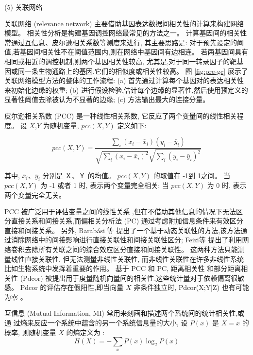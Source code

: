 (5) 关联网络

关联网络 (relevance network) 主要借助基因表达数据间相关性的计算来构建网络模型。
相关性分析是构建基因调控网络最常见的方法之一。
计算基因间的相关性常通过互信息、皮尔逊相关系数等测度来进行, 
其主要思路是: 对于预先设定的阈值,若基因间相关性不在阈值范围内,则在网络中基因间有边相连。
若两基因间具有相同或相近的调控机制,则两个基因相关性较高,
尤其是,对于同一转录因子的靶基因或同一条生物通路上的基因,它们的相似度或相关性较高。
图 \ref{fig:pre-gc} 展示了关联网络模型方法的整体的工作流程: (a) 首先通过计算每个基因对的表达相关性来初始化边缘的权重;
(b) 进行假设检验,估计每个边缘的显著性,然后使用预定义的显著性阈值去除被认为不显著的边缘;
(c) 方法输出最大的连接分量。

皮尔逊相关系数 (PCC) 是一种线性相关系数, 它反应了两个变量间的线性相关程度。
设 $X$,$Y$ 为随机变量, $pcc(X,Y)$ 定义如下:

\begin{equation}
pcc(X,Y) = \frac{{\sum\limits_i {(x_i -\bar x_i )(y_i -\bar y_i )} }}{{\sqrt {\sum\limits_i {(x_i  - \bar x_i )^2 } } \sqrt {\sum\limits_i {(y_i  - \bar y_i )^2 } } }}
\end{equation}

其中, $\bar x_i$、$\bar y_i$ 分别是 Ｘ、Ｙ 的均值。
 $pcc(X,Y)$ 的取值在 -1到 1之间。
当 $pcc(X,Y)$ 为 -1 或者 1 时, 表示两个变量完全相关;
当 $pcc(X,Y)$ 为 0 时, 表示两个变量完全无关。

PCC 被广泛用于评估变量之间的线性关系 ,但在不借助其他信息的情况下无法区分直接关系和间接关系,而偏相关分析法 (PC)  通过考虑附加信息条件来有效区分直接和间接关系。
另外, Barabási 等  提出了一个基于动态关联性的方法,该方法通过消除网络中的间接影响进行直接关联性和间接关联性区分; 
Feizi等  提出了利用网络卷积去除所有关联之间的综合效应区分直接和间接关联性。
这两种方法只能测量线性直接关联性,
但无法测量非线性关联性, 而非线性关联性在许多非线性系统比如生物系统中发挥着重要的作用。
基于 PCC 和 PC, 距离相关性  和部分距离相关性 (Pdcor)  被提出用于度量随机向量间的相关性,这些统计量对于依赖偏离很敏感。
Pdcor 的评估存在假阳性,即当向量 $X$ 非条件独立时, Pdcor(X;Y|Z) 也有可能为零 。

互信息 (Mutual Information, MI) 常用来刻画和描述两个系统间的统计相关性,或通
过熵来反应一个系统中蕴含的另一个系统信息量的大小, 设 $P(x)$ 是 $X=x$ 的概率,
则随机变量 $X$ 的熵定义为 :
\begin{equation}
    H(X) = - \sum\limits_x {P(x)\log _2 P(x)} 
\end{equation}


